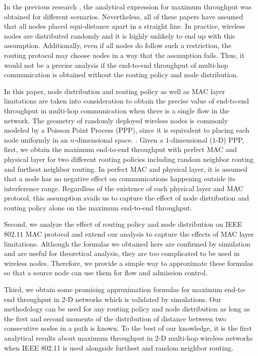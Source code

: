 \documentclass[12pt, draftclsnofoot, onecolumn]{IEEEtran}
\begin{document}
In the previous research \cite{ref4,ref5,ref6,ref8,ref9,ref10,ref14,ref17}, 
the analytical expression for maximum throughput was obtained for 
different scenarios. Nevertheless, all of these papers have assumed 
that all nodes placed equi-distance apart in a straight line. In practice, 
wireless nodes are distributed randomly and it is highly unlikely to end 
up with this assumption. Additionally, even if all nodes do follow such a 
restriction, the routing protocol may choose nodes in a way that the 
assumption fails. Thus, it would not be a precise analysis if the end-to-end 
throughput of multi-hop communication is obtained without the routing 
policy and node distribution. 

In this paper, node distribution and routing policy as well as MAC layer 
limitations are taken into consideration to obtain the precise value of end-to-end 
throughput in multi-hop communication  when there is a single flow in the network. 
The geometry of randomly deployed wireless nodes is 
commonly modeled by a Poisson Point Process (PPP), since it is equivalent to placing each node uniformly in an $n$-dimensional space.
\cite{rahmatollahi2012closed,beyme2014stochastic}. Given a $1$-dimensional ($1$-D) PPP,
first, we obtain the maximum end-to-end throughput with perfect MAC and physical layer for two 
different routing policies including random neighbor routing and furthest neighbor 
routing. In perfect MAC and physical layer, it is assumed that a node has no 
negative effect on communications happening outside its interference range. 
Regardless of the existence of such physical layer and MAC protocol, this 
assumption avails us to capture the effect of node distribution and routing 
policy alone on the maximum end-to-end throughput.

Second, we analyze the effect of routing policy and node distribution on 
IEEE $802.11$ MAC protocol and extend our analysis to capture the effects 
of MAC layer limitations. Although the formulas we obtained here are 
confirmed by simulation and are useful for theoretical analysis, they are 
too complicated to be used in wireless nodes. Therefore, we provide a 
simple way to approximate these formulas so that a source node can 
use them for flow and admission control. 

Third, we obtain some promising approximation formulas for maximum 
end-to-end throughput in $2$-D networks which is validated by simulations. 
Our methodology can be used for any routing policy and node distribution 
as long as 
the first and second moments of the distribution of distance between two consecutive 
nodes in a path is known.
To the best of our knowledge, it is the first analytical results about 
maximum throughput in $2$-D multi-hop wireless networks when IEEE 802.11 is used alongside furthest and random neighbor routing.
\end{document}
